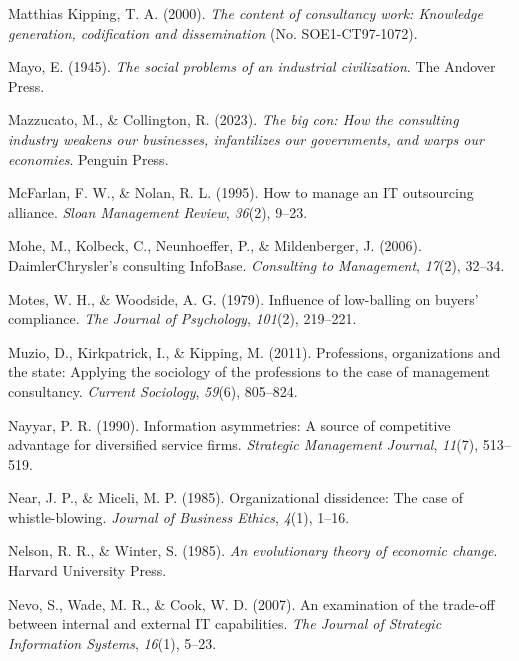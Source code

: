 \documentclass[
  man,floatsintext]{apa6}
\newlength{\cslhangindent}
\newenvironment{CSLReferences}[2] %
 {\begin{list}{}{%
  \setlength{\itemindent}{0pt}
  \setlength{\leftmargin}{0pt}
  \setlength{\parsep}{0pt}
  \ifodd #1
   \setlength{\leftmargin}{\cslhangindent}
   \setlength{\itemindent}{-1\cslhangindent}
  \fi
  \setlength{\itemsep}{#2\baselineskip}}}
 {\end{list}}
\begin{document}
\begin{CSLReferences}{1}{0}
Matthias Kipping, T. A. (2000). \emph{The content of consultancy work: Knowledge generation, codification and dissemination} (No. SOE1-CT97-1072).

Mayo, E. (1945). \emph{The social problems of an industrial civilization}. The Andover Press.

Mazzucato, M., \& Collington, R. (2023). \emph{The big con: How the consulting industry weakens our businesses, infantilizes our governments, and warps our economies}. Penguin Press.

McFarlan, F. W., \& Nolan, R. L. (1995). How to manage an IT outsourcing alliance. \emph{Sloan Management Review}, \emph{36}(2), 9--23.

Mohe, M., Kolbeck, C., Neunhoeffer, P., \& Mildenberger, J. (2006). DaimlerChrysler's consulting InfoBase. \emph{Consulting to Management}, \emph{17}(2), 32--34.

Motes, W. H., \& Woodside, A. G. (1979). Influence of low-balling on buyers' compliance. \emph{The Journal of Psychology}, \emph{101}(2), 219--221.

Muzio, D., Kirkpatrick, I., \& Kipping, M. (2011). Professions, organizations and the state: Applying the sociology of the professions to the case of management consultancy. \emph{Current Sociology}, \emph{59}(6), 805--824.

Nayyar, P. R. (1990). Information asymmetries: A source of competitive advantage for diversified service firms. \emph{Strategic Management Journal}, \emph{11}(7), 513--519.

Near, J. P., \& Miceli, M. P. (1985). Organizational dissidence: The case of whistle-blowing. \emph{Journal of Business Ethics}, \emph{4}(1), 1--16.

Nelson, R. R., \& Winter, S. (1985). \emph{An evolutionary theory of economic change}. Harvard University Press.

Nevo, S., Wade, M. R., \& Cook, W. D. (2007). An examination of the trade-off between internal and external IT capabilities. \emph{The Journal of Strategic Information Systems}, \emph{16}(1), 5--23.


\end{CSLReferences}
\end{document}
